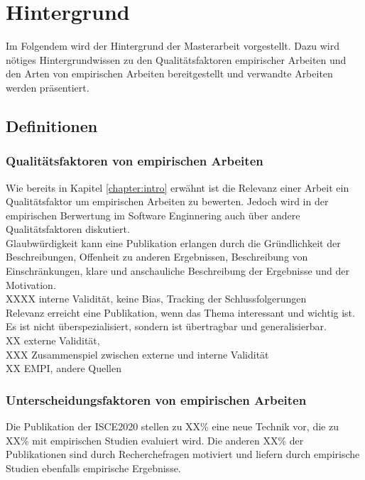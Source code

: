 \chapter{Hintergrund}
\label{chapter:background}
Im Folgendem wird der Hintergrund der Masterarbeit vorgestellt. Dazu wird nötiges Hintergrundwissen zu den Qualitätsfaktoren empirischer Arbeiten und den Arten von empirischen Arbeiten bereitgestellt und verwandte Arbeiten werden präsentiert.\\

\section{Definitionen}

\subsection{Qualitätsfaktoren von empirischen Arbeiten}
Wie bereits in Kapitel \ref{chapter:intro} erwähnt ist die Relevanz einer Arbeit ein Qualitätsfaktor um empirischen Arbeiten zu bewerten. Jedoch wird in der empirischen Berwertung im Software Enginnering auch über andere Qualitätsfaktoren diskutiert. \\

Glaubwürdigkeit kann eine Publikation erlangen durch die Gründlichkeit der Beschreibungen, Offenheit zu anderen Ergebnissen, Beschreibung von Einschränkungen, klare und anschauliche Beschreibung der Ergebnisse und der Motivation. \\
XXXX interne Validität, keine Bias, Tracking der Schlussfolgerungen \\

Relevanz erreicht eine Publikation, wenn das Thema interessant und wichtig ist. Es ist nicht überspezialisiert, sondern ist übertragbar und generalisierbar. \\
XX externe Validität,  \\

XXX Zusammenspiel zwischen externe und interne Validität \\

XX EMPI, andere Quellen \\


\subsection{Unterscheidungsfaktoren von empirischen Arbeiten}
\label{sec:empi}
Die Publikation der ISCE2020 stellen zu XX\% eine neue Technik vor, die zu XX\% mit empirischen Studien evaluiert wird. Die anderen XX\% der Publikationen sind durch Recherchefragen motiviert und liefern durch empirische Studien ebenfalls empirische Ergebnisse. \\


